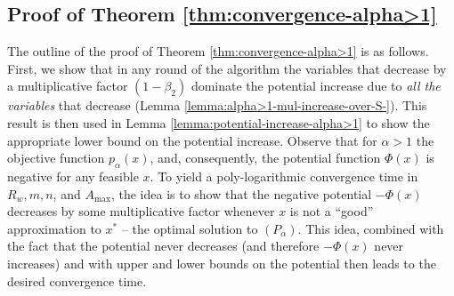 \documentclass[11pt]{article}
\newcommand{\wratio}{R_w}
\begin{document}
\subsection{Proof of Theorem \ref{thm:convergence-alpha>1}}\label{section:alpha>1}
The outline of the proof of Theorem \ref{thm:convergence-alpha>1} is as follows. First, we show that in any round of the algorithm the variables that decrease by a multiplicative factor $(1-\beta_2)$ dominate the potential increase due to \emph{all the variables} that decrease (Lemma \ref{lemma:alpha>1-mul-increase-over-S-}). 
This result is then used in Lemma \ref{lemma:potential-increase-alpha>1} to show the appropriate lower bound on the potential increase. Observe that for $\alpha > 1$ the objective function $p_\alpha(x)$, and, consequently, the potential function $\Phi(x)$ is negative for any feasible $x$. To yield a poly-logarithmic convergence time in $\wratio, m, n$, and $A_{\max}$, the idea is to show that the negative potential $-\Phi(x)$ decreases by some multiplicative factor whenever $x$ is not a ``good'' approximation to $x^*$ -- the optimal solution to $(P_\alpha)$. This idea, combined with the fact that the potential never decreases (and therefore $-\Phi(x)$ never increases) and with upper and lower bounds on the potential then leads to the desired convergence time. 
\end{document}
